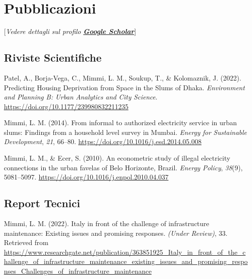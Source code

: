 \documentclass[11pt,a4paper,]{awesome-cv}
\begin{document}
\newpage

\hypertarget{pubblicazioni}{%
\section{\texorpdfstring{\faBook[regular] Pubblicazioni}{Pubblicazioni}}\label{pubblicazioni}}

\medskip

{[}\emph{Vedere dettagli sul profilo
\href{https://scholar.google.com/citations?user=OBYla5gAAAAJ\&hl=en\&oi=ao}{\textbf{Google
Scholar}}}{]}

\bigskip

\hypertarget{riviste-scientifiche}{%
\subsection{\texorpdfstring{\faBookmark[regular] Riviste
Scientifiche}{Riviste Scientifiche}}\label{riviste-scientifiche}}

\hypertarget{bibliography}{}
\leavevmode{}%
Patel, A., Borja-Vega, C., Mimmi, L. M., Soukup, T., \& Kolomaznik, J.
(2022). Predicting Housing Deprivation from Space in the Slums of Dhaka.
\emph{Environment and Planning B: Urban Analytics and City Science}.
\url{https://doi.org/10.1177/239980832211235}

\leavevmode{}%
Mimmi, L. M. (2014). From informal to authorized electricity service in
urban slums: Findings from a household level survey in Mumbai.
\emph{Energy for Sustainable Development}, \emph{21}, 66--80.
\url{https://doi.org/10.1016/j.esd.2014.05.008}

\leavevmode{}%
Mimmi, L. M., \& Ecer, S. (2010). An econometric study of illegal
electricity connections in the urban favelas of Belo Horizonte, Brazil.
\emph{Energy Policy}, \emph{38}(9), 5081--5097.
\url{https://doi.org/10.1016/j.enpol.2010.04.037}

\bigskip

\hypertarget{report-tecnici}{%
\subsection{\texorpdfstring{\faBookOpen[regular] Report
Tecnici}{Report Tecnici}}\label{report-tecnici}}

\hypertarget{bibliography}{}
\leavevmode{}%
Mimmi, L. M. (2022). Italy in front of the challenge of infrastructure
maintenance: Existing issues and promising responses. \emph{(Under
Review)}, 33. Retrieved from
\url{https://www.researchgate.net/publication/363851925_Italy_in_front_of_the_challenge_of_infrastructure_maintenance_existing_issues_and_promising_responses_Challenges_of_infrastructure_maintenance}
\end{document}
